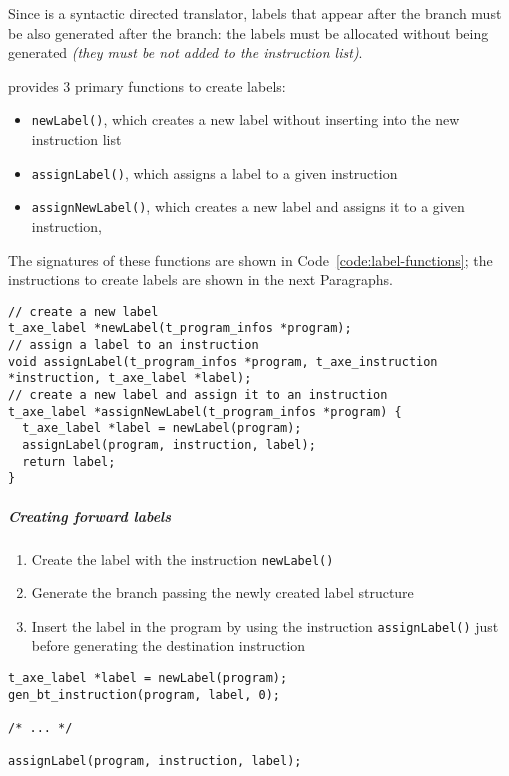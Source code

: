 \documentclass[english]{article}
\begin{document}
Since \acse is a syntactic directed translator, labels that appear after the branch must be also generated after the branch:
the labels must be allocated without being generated \textit{(they must be not added to the instruction list)}.

\acse provides \(3\) primary functions to create labels:

\begin{itemize}[label=\textbf{\texttt{>}}]
  \item \texttt{newLabel()}, which creates a new label without inserting into the new instruction list
  \item \texttt{assignLabel()}, which assigns a label to a given instruction
  \item \texttt{assignNewLabel()}, which creates a new label and assigns it to a given instruction,
\end{itemize}

The signatures of these functions are shown in Code~\ref{code:label-functions};
the instructions to create labels are shown in the next Paragraphs.

\begin{onepage}
  \begin{lstlisting}[language=LANCE, caption={Label functions}, label={code:label-functions}]
// create a new label
t_axe_label *newLabel(t_program_infos *program);
// assign a label to an instruction
void assignLabel(t_program_infos *program, t_axe_instruction *instruction, t_axe_label *label);
// create a new label and assign it to an instruction
t_axe_label *assignNewLabel(t_program_infos *program) {
  t_axe_label *label = newLabel(program);
  assignLabel(program, instruction, label);
  return label;
}
\end{lstlisting}
\end{onepage}

\subparagraph*{Creating forward labels}

\begin{enumerate}
  \item Create the label with the instruction \texttt{newLabel()}
  \item Generate the branch passing the newly created label structure
  \item Insert the label in the program by using the instruction \texttt{assignLabel()} just before generating the destination instruction
\end{enumerate}

\begin{onepage}
  \begin{lstlisting}[language=LANCE, caption={Creating forward labels}, label={code:forward-labels}]
t_axe_label *label = newLabel(program);
gen_bt_instruction(program, label, 0);

/* ... */

assignLabel(program, instruction, label);
\end{lstlisting}
\end{onepage}
\end{document}
